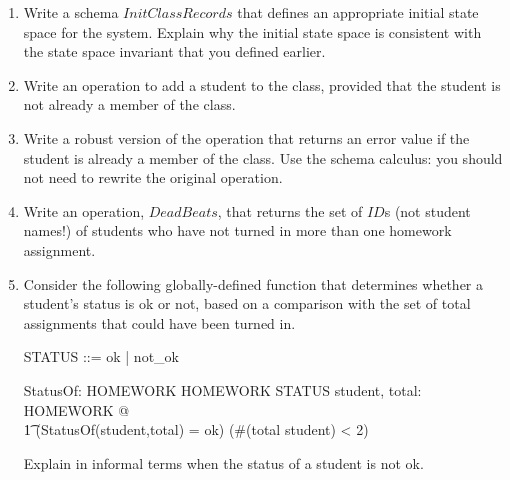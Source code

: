 \documentclass{article}
\begin{document}
\begin{enumerate}
\begin{enumerate}
\begin{itemize}
\end{itemize}


\item Write a schema $InitClassRecords$ that defines an
appropriate initial state space for the system. Explain why the
initial state space is consistent with the state space invariant
that you defined earlier.


\item Write an operation to add a student to the class, provided
that the student is not already a member of the class.


\item Write a robust version of the operation that returns an error
value if the student is already a member of the class. Use the schema
calculus: you should not need to rewrite the original operation.


\item Write an operation, $DeadBeats$, that returns the set of $ID$s
(not student names!) of students who have not turned in more than one homework assignment.


\item Consider the following globally-defined function that
determines whether a student's status is ok or not, based on a
comparison with the set of total assignments that could have been
turned in.

\begin{zed}
    STATUS ::= ok | not\_ok
\end{zed}

\begin{axdef}
    StatusOf: \power HOMEWORK \cross \power HOMEWORK \fun STATUS
\where
    \forall student, total: \power HOMEWORK @ \\
\t1    (StatusOf(student,total) = ok) \iff (\#(total \setminus
student) < 2)
\end{axdef}

Explain in informal terms when the status of a student is not ok.


\end{enumerate}


\end{enumerate}
\end{document}
